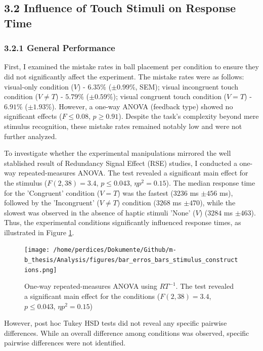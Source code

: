 \documentclass[12pt,oneside,openright]{report}
\begin{document}
\subsection*{3.2 Influence of Touch Stimuli on Response Time}
\subsubsection*{3.2.1 General Performance}

First, I examined the mistake rates in ball placement per condition to ensure they did not significantly affect the experiment. The mistake rates were as follows: visual-only condition ($V$) - $6.35\%$ ($\pm 0.99\%$, SEM); visual incongruent touch condition ($V \neq T$) - $5.79\%$ ($\pm 0.59\%$); visual congruent touch condition ($V=T$) - $6.91\%$ ($\pm 1.93\%$). However, a one-way ANOVA (feedback type) showed no significant effects ($ F \leq 0.08$, $p \geq 0.91$). Despite the task's complexity beyond mere stimulus recognition, these mistake rates remained notably low and were not further analyzed.

To investigate whether the experimental manipulations mirrored the well stablished result of Redundancy Signal Effect (RSE) studies, I conducted a one-way repeated-measures ANOVA. The test revealed a significant main effect for the stimulus ($F(2,38) = 3.4$, $p \leq 0.043$, $\eta p^2 = 0.15$). The median response time for the 'Congruent' condition ($V=T$) was the fastest ($3236$ ms $\pm 456$ ms), followed by the 'Incongruent' ($V \neq T$) condition ($3268$ ms $\pm 470$), while the slowest was observed in the absence of haptic stimuli 'None' ($V$) ($3284$ ms $\pm 463$). Thus, the experimental conditions significantly influenced response times, as illustrated in Figure \ref{fig:error}.

\begin{figure}[!ht]
    \centering
    \texttt{[image: /home/perdices/Dokumente/Github/m-b\_thesis/Analysis/figures/bar\_erros\_bars\_stimulus\_constructions.png]}
    \caption{One-way repeated-measures ANOVA using $RT^{-1}$. The test revealed a significant main effect for the conditions ($F(2,38) = 3.4$, $p \leq 0.043$, $\eta p^2 = 0.15$)}
    \label{fig:error}
\end{figure}


However, post hoc Tukey HSD tests did not reveal any specific pairwise differences. While an overall difference among conditions was observed, specific pairwise differences were not identified.
\end{document}

